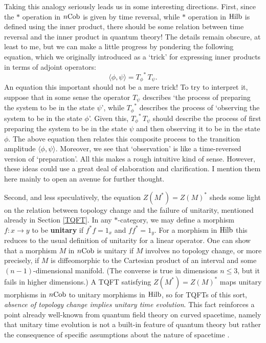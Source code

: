 \documentclass[12pt]{article}
\newcommand{\Hilb}{{\rm Hilb}}
\newcommand{\Cob}{{\rm Cob}}
\renewcommand{\to}{\rightarrow}
\newcommand{\maps}{\colon}
\begin{document}
Taking this analogy seriously leads us in some interesting directions.
First, since the $\ast$ operation in $n\Cob$ is given by time
reversal, while $\ast$ operation in $\Hilb$ is defined using the inner
product, there should be some relation between time reversal and the
inner product in quantum theory!  The details remain obscure, at least
to me, but we can make a little progress by pondering the following
equation, which we originally introduced as a `trick' for expressing
inner products in terms of adjoint operators:
\[        \langle \phi,\psi \rangle = {T_\phi}^{\!\!\ast} \, T_\psi . \]
An equation this important should not be a mere trick!  To try to
interpret it, suppose that in some sense the operator $T_\psi$
describes `the process of preparing the system to be in the state
$\psi$', while ${T_\phi}^{\!\!\ast}$ describes the process of
`observing the system to be in the state $\phi$'.  Given this,
${T_\phi}^{\!\!\ast} \, T_\psi$ should describe the process of first
preparing the system to be in the state $\psi$ and then observing it
to be in the state $\phi$.  The above equation then relates this
composite process to the transition amplitude $\langle \phi, \psi
\rangle$.  Moreover, we see that `observation' is like a time-reversed
version of `preparation'.  All this makes a rough intuitive kind of
sense.  However, these ideas could use a great deal of elaboration and
clarification.  I mention them here mainly to open an avenue for
further thought.

Second, and less speculatively, the equation $Z(M^\ast) = Z(M)^\ast$
sheds some light on the relation between topology change and the
failure of unitarity, mentioned already in Section \ref{TQFT}.  In any
$\ast$-category, we may define a morphism $f \maps x \to y$ to be {\bf
unitary} if $f^\ast f = 1_x$ and $ff^\ast = 1_y$.  For a morphism in
$\Hilb$ this reduces to the usual definition of unitarity for a linear
operator.  One can show that a morphism $M$ in $n\Cob$ is unitary if 
$M$ involves no topology change, or more precisely, if $M$ is diffeomorphic 
to the Cartesian product of an interval and some $(n-1)$-dimensional manifold.  
(The converse is true in dimensions $n \le 3$, but it fails in higher 
dimensions.)  A TQFT satisfying $Z(M^\ast) = Z(M)^\ast$ maps
unitary morphisms in $n\Cob$ to unitary morphisms in $\Hilb$, so
for TQFTs of this sort, {\it absence of topology change
implies unitary time evolution}.  This fact reinforces a point already 
well-known from quantum field theory on curved spacetime, namely that 
unitary time evolution is not a built-in feature of quantum theory 
but rather the consequence of specific assumptions about the nature 
of spacetime \cite{Earman}.
\end{document}
